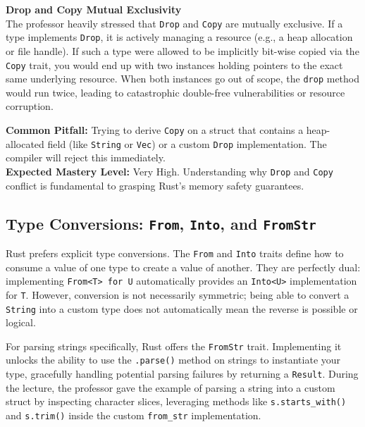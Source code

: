 \begin{examprioritybox}
\textbf{Drop and Copy Mutual Exclusivity} \\
The professor heavily stressed that \texttt{Drop} and \texttt{Copy} are mutually exclusive. If a type implements \texttt{Drop}, it is actively managing a resource (e.g., a heap allocation or file handle). If such a type were allowed to be implicitly bit-wise copied via the \texttt{Copy} trait, you would end up with two instances holding pointers to the exact same underlying resource. When both instances go out of scope, the \texttt{drop} method would run twice, leading to catastrophic double-free vulnerabilities or resource corruption.

\textbf{Common Pitfall:} Trying to derive \texttt{Copy} on a struct that contains a heap-allocated field (like \texttt{String} or \texttt{Vec}) or a custom \texttt{Drop} implementation. The compiler will reject this immediately. \\
\textbf{Expected Mastery Level:} Very High. Understanding why \texttt{Drop} and \texttt{Copy} conflict is fundamental to grasping Rust's memory safety guarantees.
\end{examprioritybox}

\subsection*{Type Conversions: \texttt{From}, \texttt{Into}, and \texttt{FromStr}}
Rust prefers explicit type conversions. The \texttt{From} and \texttt{Into} traits define how to consume a value of one type to create a value of another. They are perfectly dual: implementing \texttt{From<T> for U} automatically provides an \texttt{Into<U>} implementation for \texttt{T}. However, conversion is not necessarily symmetric; being able to convert a \texttt{String} into a custom type does not automatically mean the reverse is possible or logical.

For parsing strings specifically, Rust offers the \texttt{FromStr} trait. Implementing it unlocks the ability to use the \texttt{.parse()} method on strings to instantiate your type, gracefully handling potential parsing failures by returning a \texttt{Result}. During the lecture, the professor gave the example of parsing a string into a custom struct by inspecting character slices, leveraging methods like \texttt{s.starts\_with()} and \texttt{s.trim()} inside the custom \texttt{from\_str} implementation.

